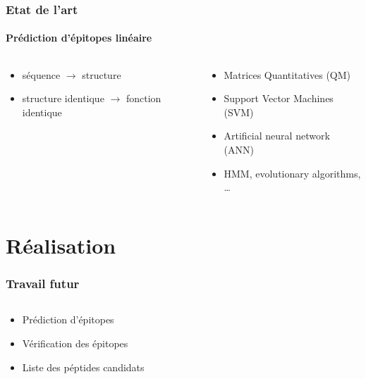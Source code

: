 \documentclass[11pt, handout]{beamer}
\begin{document}
\begin{frame}
\frametitle{Etat de l'art}
\framesubtitle{Prédiction d'épitopes linéaire}
\begin{columns}[c]
	\begin{column}[c]{5cm}
		\begin{itemize}[<+->]
			\item séquence $\rightarrow$ structure
			\item structure identique $\rightarrow$ fonction identique
		\end{itemize}
	\end{column}
	\begin{column}[c]{5cm}
		\begin{itemize}[<+->]
			\item Matrices Quantitatives (QM)
			\item Support Vector Machines (SVM)
			\item Artificial neural network (ANN)
			\item HMM, evolutionary algorithms, \ldots
		\end{itemize}
	\end{column}
\end{columns}
\end{frame}

\section{Réalisation}
\begin{frame}
\frametitle{Travail futur}
\begin{columns}[c]
	\begin{column}[c]{5cm}
		\begin{itemize}[<+->]
			\item Prédiction d'épitopes
			\item Vérification des épitopes
			\item Liste des péptides candidats
		\end{itemize}
	\end{column}
	\begin{column}[c]{5cm}
		
	\end{column}
\end{columns}
\end{frame}
\end{document}

